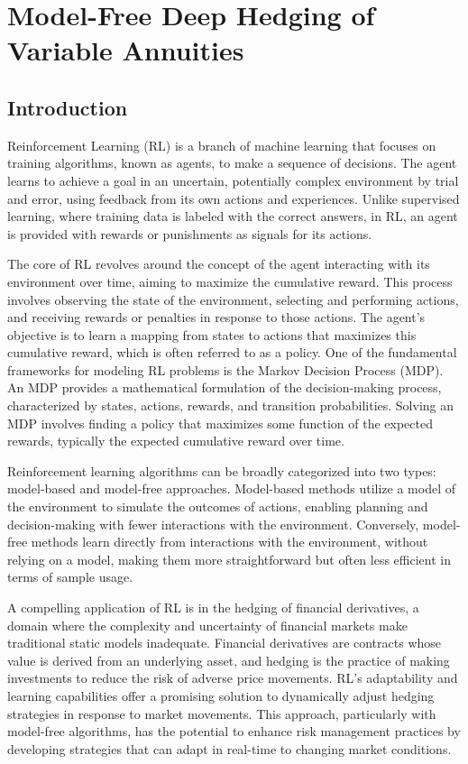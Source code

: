 \chapter{Model-Free Deep Hedging of Variable Annuities}

\section{Introduction}

Reinforcement Learning (RL) is a branch of machine learning that focuses on training algorithms, known as agents, to make a sequence of decisions. 
The agent learns to achieve a goal in an uncertain, potentially complex environment by trial and error, using feedback from its own actions and experiences. 
Unlike supervised learning, where training data is labeled with the correct answers, in RL, an agent is provided with rewards or punishments as signals for its actions.

The core of RL revolves around the concept of the agent interacting with its environment over time, aiming to maximize the cumulative reward. 
This process involves observing the state of the environment, selecting and performing actions, and receiving rewards or penalties in response to those actions. 
The agent's objective is to learn a mapping from states to actions that maximizes this cumulative reward, which is often referred to as a policy. 
One of the fundamental frameworks for modeling RL problems is the Markov Decision Process (MDP). 
An MDP provides a mathematical formulation of the decision-making process, characterized by states, actions, rewards, and transition probabilities. Solving an MDP involves finding a policy that maximizes some function of the expected rewards, typically the expected cumulative reward over time.

Reinforcement learning algorithms can be broadly categorized into two types: model-based and model-free approaches. 
Model-based methods utilize a model of the environment to simulate the outcomes of actions, enabling planning and decision-making with fewer interactions with the environment. 
Conversely, model-free methods learn directly from interactions with the environment, without relying on a model, making them more straightforward but often less efficient in terms of sample usage.

A compelling application of RL is in the hedging of financial derivatives, a domain where the complexity and uncertainty of financial markets make traditional static models inadequate.
Financial derivatives are contracts whose value is derived from an underlying asset, and hedging is the practice of making investments to reduce the risk of adverse price movements.
RL's adaptability and learning capabilities offer a promising solution to dynamically adjust hedging strategies in response to market movements.
This approach, particularly with model-free algorithms, has the potential to enhance risk management practices by developing strategies that can adapt in real-time to changing market conditions.

